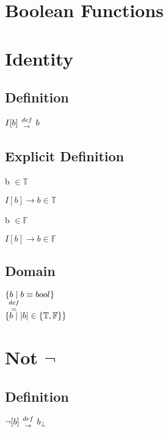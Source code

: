 \documentclass[11pt]{article}
\def \fdef{\hspace{1mm} {def \atop \rightarrow} \hspace{1mm}}
\def \feq{\hspace{1mm} {def \atop =} \hspace{1mm}}
\begin{document}
\section*{Boolean Functions}

\section{Identity}
\subsection{Definition}
\vspace{2mm}
\begin{center}
$
I[b] \fdef b
$
\end{center}
\subsection{Explicit Definition}
\vspace{2mm}
b $\in \mathbb{T}$
\begin{center}
$
I[b] \rightarrow b \in \mathbb{T}
$
\end{center}
b $\in \mathbb{F}$
\begin{center}
$
I[b] \rightarrow b \in \mathbb{F}
$
\end{center}
\subsection{Domain}
\begin{center}
$
\{ b \hspace{1mm}| \hspace{1mm} b \equiv bool\}
$
\\ \vspace{2mm}
$
\feq
$
\\ \vspace{2mm}
$
\{ b \hspace{1mm}| \hspace{1mm} |b| \in \{\mathbb{T}, \mathbb{F}\}\}
$
\end{center}
\section{Not $\lnot$}
\subsection{Definition}
\begin{center}
$
\lnot[b] \fdef b_{\perp}
$
\end{center}
\end{document}
